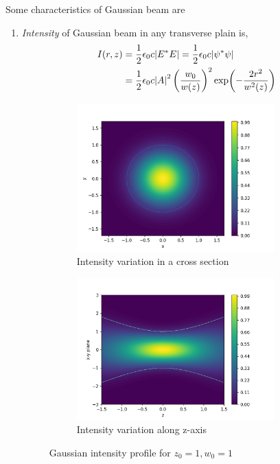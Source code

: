 \documentclass[11pt,a4paper]{article}
\numberwithin{equation}{section}
\begin{document}
Some characteristics of Gaussian beam are
\begin{enumerate}
	\item 
	\textit{Intensity} of Gaussian beam in any transverse plain is, 
	\begin{align}
		I(r,z)&= \frac{1}{2}\epsilon_0c\abs{E^\ast E} = \frac{1}{2}\epsilon_0c\abs{\psi^\ast \psi}\nonumber\\
		&= \frac{1}{2} \epsilon_0c \abs{A}^2 \left(\frac{w_0}{w(z)}\right)^2  \exp(-\frac{2r^2}{w^2(z)})
	\end{align}
\begin{figure}[H]
	\begin{subfigure}[H]{0.49\textwidth}
		\centering
		\includegraphics[width=0.9\textwidth]{intensity.png}
		\caption{Intensity variation in a cross section}
		\label{fig:g intensity}
	\end{subfigure}
	\hfill
	\begin{subfigure}[H]{0.49\textwidth}
		\centering
		\includegraphics[width=0.9\textwidth]{intensity_var.png}
		\caption{Intensity variation along z-axis}
		\label{fig:g intensity var}
	\end{subfigure}
\caption{Gaussian intensity profile for $z_0=1,w_0=1$}
\end{figure}


\end{enumerate}
\end{document}
